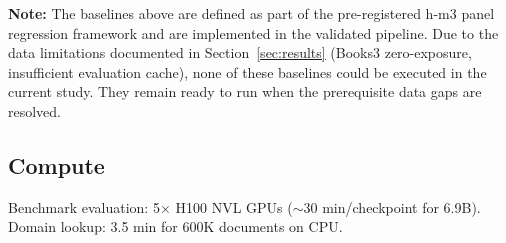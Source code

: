 \textbf{Note:} The baselines above are defined as part of the pre-registered h-m3 panel regression framework and are implemented in the validated pipeline. Due to the data limitations documented in Section~\ref{sec:results} (Books3 zero-exposure, insufficient evaluation cache), none of these baselines could be executed in the current study. They remain ready to run when the prerequisite data gaps are resolved.

\subsection{Compute}

Benchmark evaluation: 5$\times$ H100 NVL GPUs ($\sim$30 min/checkpoint for 6.9B). Domain lookup: 3.5 min for 600K documents on CPU.

